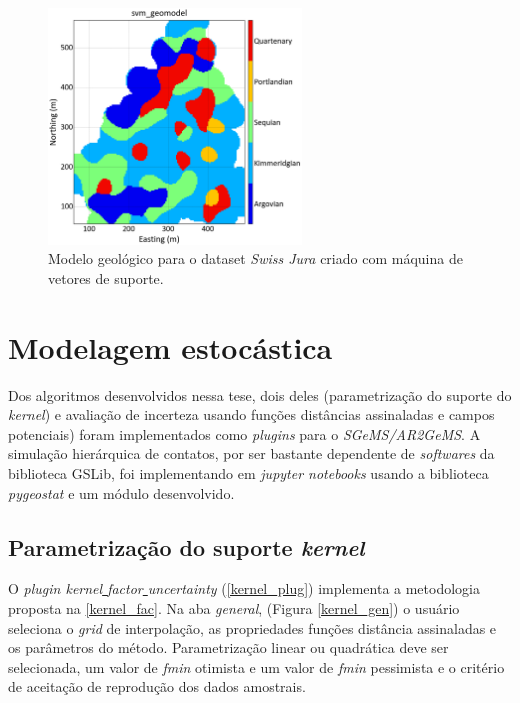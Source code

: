 \begin{figure}[H]
	\centering
	\caption{\label{jura_svm}Modelo geológico para o dataset \textit{Swiss Jura} criado com máquina de vetores de suporte.}
	\includegraphics[width=0.6\textwidth]{apendice/imagens/svmgeomodel.png}
\end{figure}

\section{Modelagem estocástica}

Dos algoritmos desenvolvidos nessa tese, dois deles (parametrização do suporte do \textit{kernel}) e avaliação de incerteza usando funções distâncias assinaladas e campos potenciais) foram implementados como \textit{plugins} para o \textit{SGeMS/AR2GeMS}. A simulação hierárquica de contatos, por ser bastante dependente de \textit{softwares} da biblioteca GSLib, foi implementando em \textit{jupyter notebooks} usando a biblioteca \textit{pygeostat} e um módulo desenvolvido.

\subsection{Parametrização do suporte \textit{kernel}}

O \textit{plugin kernel\underline{ }factor\underline{ }uncertainty} (\autoref{kernel_plug}) implementa a metodologia proposta na \autoref{kernel_fac}. Na aba \textit{general}, (Figura \autoref{kernel_gen}) o usuário seleciona o \textit{grid} de interpolação, as propriedades funções distância assinaladas e os parâmetros do método. Parametrização linear ou  quadrática deve ser selecionada, um valor de \textit{fmin} otimista e um valor de \textit{fmin} pessimista e o critério de aceitação de reprodução dos dados amostrais.

